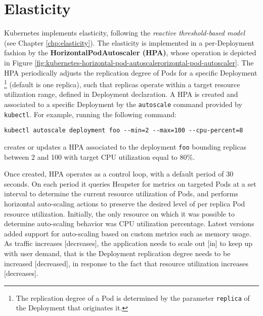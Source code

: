 \section{Elasticity}
\label{sec:kubernetes-elasticity}

Kubernetes implements elasticity, following the \textit{reactive threshold-based model} (see Chapter \ref{chp:elasticity}).
%
The elasticity is implemented in a per-Deployment fashion by the \textbf{HorizontalPodAutoscaler (HPA)}, whose operation is depicted in Figure \ref{fig:kubernetes-horizontal-pod-autoscalerorizontal-pod-autoscaler}.
%
The HPA periodically adjusts the replication degree of Pods for a specific Deployment 
\footnote{The replication degree of a Pod is determined by the parameter \texttt{replica} of the Deployment that originates it.}
(default is one replica), such that replicas operate within a target resource utilization range, defined in Deployment declaration.
%
A HPA is created and associated to a specific Deployment by the \texttt{autoscale} command provided by \texttt{kubectl}.
%
For example, running the following command:
%
\begin{verbatim}
kubectl autoscale deployment foo --min=2 --max=100 --cpu-percent=8
\end{verbatim}
%
creates or updates a HPA associated to the deployment \texttt{foo} bounding replicas between 2 and 100 with target CPU utilization equal to 80\%.

Once created, HPA operates as a control loop, with a default period of 30 seconds.
%
On each period it queries Heapster for metrics on targeted Pods at a set interval to determine the current resource utilization of Pods, and performs horizontal auto-scaling actions to preserve the desired level of per replica Pod resource utilization.
%
Initially, the only resource on which it was possible to determine auto-scaling behavior was CPU utilization percentage.
%
Latest versions added support for auto-scaling based on custom metrics such as memory usage.
%
As traffic increases [decreases], the application needs to scale out [in] to keep up with user demand, that is the Deployment replication degree needs to be increased [decreased], in response to the fact that resource utilization increases [decreases].

